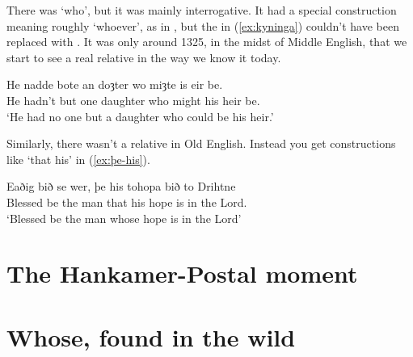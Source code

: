 There was  `who', but it was mainly interrogative. It had a special construction meaning roughly `whoever', as in , but the  in (\ref{ex:kyninga}) couldn't have been replaced with . It was only around 1325, in the midst of Middle English, that we start to see a real relative  in the way we know it today.

\ea \label{ex:doȝter-wo}
    \gll He nadde bote an doȝter wo miȝte is eir be.\\
        He hadn't but one daughter who might his heir be.\\
    \glt `He had no one but a daughter who could be his heir.'
\z

Similarly, there wasn't a relative  in Old English. Instead you get constructions like  `that his' in (\ref{ex:þe-his}).

\ea \label{ex:þe-his}
    \gll Eaðig bið se wer, þe his tohopa bið to Drihtne\\
        Blessed be the man that his hope is in the Lord.\\
    \glt `Blessed be the man whose hope is in the Lord'
\z

\section{The Hankamer-Postal moment}

%

\section{Whose, found in the wild}

%
%

